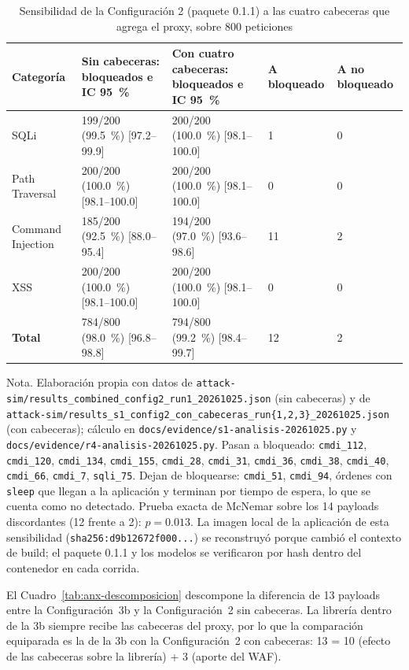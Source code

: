 \begin{table}[H]
\centering
\small
\begin{tabular}{|L{2.7cm}|L{3.7cm}|L{3.7cm}|L{1.6cm}|L{1.6cm}|}
\hline
\textbf{Categoría} & \textbf{Sin cabeceras: bloqueados e IC 95~\%} & \textbf{Con cuatro cabeceras: bloqueados e IC 95~\%} & \textbf{A bloqueado} & \textbf{A no bloqueado} \\ \hline
SQLi & 199/200 (99.5~\%) [97.2--99.9] & 200/200 (100.0~\%) [98.1--100.0] & 1 & 0 \\ \hline
Path Traversal & 200/200 (100.0~\%) [98.1--100.0] & 200/200 (100.0~\%) [98.1--100.0] & 0 & 0 \\ \hline
Command Injection & 185/200 (92.5~\%) [88.0--95.4] & 194/200 (97.0~\%) [93.6--98.6] & 11 & 2 \\ \hline
XSS & 200/200 (100.0~\%) [98.1--100.0] & 200/200 (100.0~\%) [98.1--100.0] & 0 & 0 \\ \hline
\textbf{Total} & 784/800 (98.0~\%) [96.8--98.8] & 794/800 (99.2~\%) [98.4--99.7] & 12 & 2 \\ \hline
\end{tabular}
\caption[Sensibilidad de la Configuración 2 a las cabeceras del proxy]{Sensibilidad de la Configuración 2 (paquete 0.1.1) a las cuatro cabeceras que agrega el proxy, sobre 800 peticiones}
\label{tab:anx-sensibilidad}
\end{table}
{\footnotesize Nota. Elaboración propia con datos de
\texttt{attack-sim/results\_combined\_config2\_run1\_20261025.json} (sin cabeceras) y de
\texttt{attack-sim/results\_s1\_config2\_con\_cabeceras\_run\{1,2,3\}\_20261025.json} (con cabeceras);
cálculo en \texttt{docs/evidence/s1-analisis-20261025.py} y
\texttt{docs/evidence/r4-analisis-20261025.py}. Pasan a bloqueado: \texttt{cmdi\_112}, \texttt{cmdi\_120}, \texttt{cmdi\_134}, \texttt{cmdi\_155}, \texttt{cmdi\_28}, \texttt{cmdi\_31}, \texttt{cmdi\_36}, \texttt{cmdi\_38}, \texttt{cmdi\_40}, \texttt{cmdi\_66}, \texttt{cmdi\_7}, \texttt{sqli\_75}. Dejan de bloquearse: \texttt{cmdi\_51}, \texttt{cmdi\_94}, órdenes con \texttt{sleep} que llegan a la aplicación y terminan por tiempo de
espera, lo que se cuenta como no detectado. Prueba exacta de McNemar sobre los 14 payloads
discordantes (12 frente a 2): $p = 0.013$. La imagen local de la aplicación de esta sensibilidad
(\texttt{sha256:d9b12672f000...}) se reconstruyó porque cambió el contexto de build; el paquete
0.1.1 y los modelos se verificaron por hash dentro del contenedor en cada corrida.}

El Cuadro~\ref{tab:anx-descomposicion} descompone la diferencia de 13 payloads entre la
Configuración~3b y la Configuración~2 sin cabeceras. La librería dentro de la 3b siempre recibe las
cabeceras del proxy, por lo que la comparación equiparada es la de la 3b con la Configuración~2 con
cabeceras: 13 = 10 (efecto de las cabeceras sobre la librería) + 3 (aporte del WAF).

